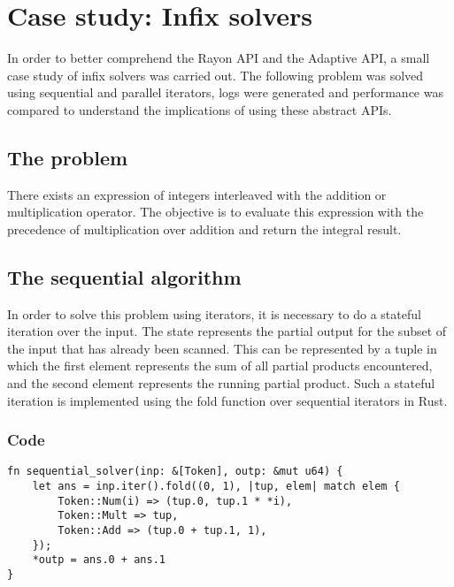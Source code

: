 
\chapter{Case study: Infix solvers} %

\label{Chapter5} %

In order to better comprehend the Rayon API and the Adaptive API, a small case study of infix solvers was carried out. The following problem was solved using sequential and parallel iterators, logs were generated and performance was compared to understand the implications of using these abstract APIs.

\section{The problem}
There exists an expression of integers interleaved with the addition or multiplication operator. The objective is to evaluate this expression with the precedence of multiplication over addition and return the integral result.
\section{The sequential algorithm}
In order to solve this problem using iterators, it is necessary to do a stateful iteration over the input. The state represents the partial output for the subset of the input that has already been scanned. This can be represented by a tuple in which the first element represents the sum of all partial products encountered, and the second element represents the running partial product. Such a stateful iteration is implemented using the fold function over sequential iterators in Rust.
\subsection{Code}
\begin{verbatim}
fn sequential_solver(inp: &[Token], outp: &mut u64) {
    let ans = inp.iter().fold((0, 1), |tup, elem| match elem {
        Token::Num(i) => (tup.0, tup.1 * *i),
        Token::Mult => tup,
        Token::Add => (tup.0 + tup.1, 1),
    });
    *outp = ans.0 + ans.1
}
\end{verbatim}
